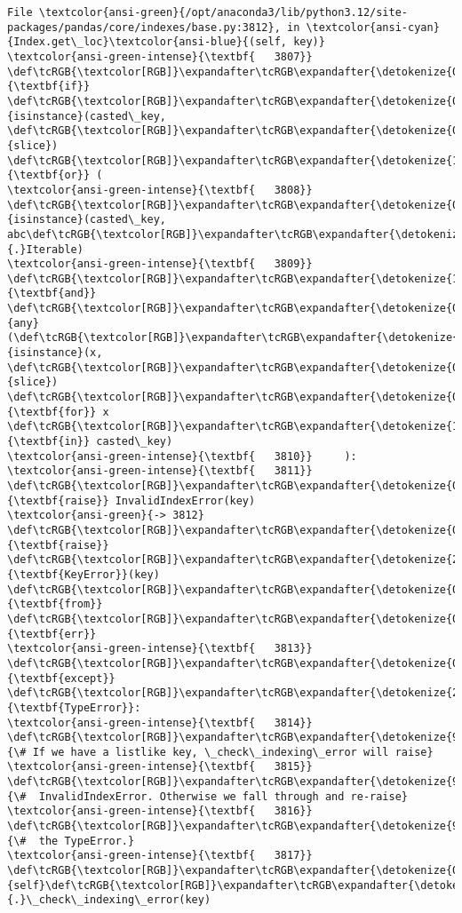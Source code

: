 \documentclass[11pt]{article}
\begin{document}
\begin{Verbatim}[commandchars=\\\{\}, frame=single, framerule=2mm, rulecolor=\color{outerrorbackground}]
File \textcolor{ansi-green}{/opt/anaconda3/lib/python3.12/site-packages/pandas/core/indexes/base.py:3812}, in \textcolor{ansi-cyan}{Index.get\_loc}\textcolor{ansi-blue}{(self, key)}
\textcolor{ansi-green-intense}{\textbf{   3807}}     \def\tcRGB{\textcolor[RGB]}\expandafter\tcRGB\expandafter{\detokenize{0,135,0}}{\textbf{if}} \def\tcRGB{\textcolor[RGB]}\expandafter\tcRGB\expandafter{\detokenize{0,135,0}}{isinstance}(casted\_key, \def\tcRGB{\textcolor[RGB]}\expandafter\tcRGB\expandafter{\detokenize{0,135,0}}{slice}) \def\tcRGB{\textcolor[RGB]}\expandafter\tcRGB\expandafter{\detokenize{175,0,255}}{\textbf{or}} (
\textcolor{ansi-green-intense}{\textbf{   3808}}         \def\tcRGB{\textcolor[RGB]}\expandafter\tcRGB\expandafter{\detokenize{0,135,0}}{isinstance}(casted\_key, abc\def\tcRGB{\textcolor[RGB]}\expandafter\tcRGB\expandafter{\detokenize{98,98,98}}{.}Iterable)
\textcolor{ansi-green-intense}{\textbf{   3809}}         \def\tcRGB{\textcolor[RGB]}\expandafter\tcRGB\expandafter{\detokenize{175,0,255}}{\textbf{and}} \def\tcRGB{\textcolor[RGB]}\expandafter\tcRGB\expandafter{\detokenize{0,135,0}}{any}(\def\tcRGB{\textcolor[RGB]}\expandafter\tcRGB\expandafter{\detokenize{0,135,0}}{isinstance}(x, \def\tcRGB{\textcolor[RGB]}\expandafter\tcRGB\expandafter{\detokenize{0,135,0}}{slice}) \def\tcRGB{\textcolor[RGB]}\expandafter\tcRGB\expandafter{\detokenize{0,135,0}}{\textbf{for}} x \def\tcRGB{\textcolor[RGB]}\expandafter\tcRGB\expandafter{\detokenize{175,0,255}}{\textbf{in}} casted\_key)
\textcolor{ansi-green-intense}{\textbf{   3810}}     ):
\textcolor{ansi-green-intense}{\textbf{   3811}}         \def\tcRGB{\textcolor[RGB]}\expandafter\tcRGB\expandafter{\detokenize{0,135,0}}{\textbf{raise}} InvalidIndexError(key)
\textcolor{ansi-green}{-> 3812}     \def\tcRGB{\textcolor[RGB]}\expandafter\tcRGB\expandafter{\detokenize{0,135,0}}{\textbf{raise}} \def\tcRGB{\textcolor[RGB]}\expandafter\tcRGB\expandafter{\detokenize{215,95,95}}{\textbf{KeyError}}(key) \def\tcRGB{\textcolor[RGB]}\expandafter\tcRGB\expandafter{\detokenize{0,135,0}}{\textbf{from}} \def\tcRGB{\textcolor[RGB]}\expandafter\tcRGB\expandafter{\detokenize{0,0,255}}{\textbf{err}}
\textcolor{ansi-green-intense}{\textbf{   3813}} \def\tcRGB{\textcolor[RGB]}\expandafter\tcRGB\expandafter{\detokenize{0,135,0}}{\textbf{except}} \def\tcRGB{\textcolor[RGB]}\expandafter\tcRGB\expandafter{\detokenize{215,95,95}}{\textbf{TypeError}}:
\textcolor{ansi-green-intense}{\textbf{   3814}}     \def\tcRGB{\textcolor[RGB]}\expandafter\tcRGB\expandafter{\detokenize{95,135,135}}{\# If we have a listlike key, \_check\_indexing\_error will raise}
\textcolor{ansi-green-intense}{\textbf{   3815}}     \def\tcRGB{\textcolor[RGB]}\expandafter\tcRGB\expandafter{\detokenize{95,135,135}}{\#  InvalidIndexError. Otherwise we fall through and re-raise}
\textcolor{ansi-green-intense}{\textbf{   3816}}     \def\tcRGB{\textcolor[RGB]}\expandafter\tcRGB\expandafter{\detokenize{95,135,135}}{\#  the TypeError.}
\textcolor{ansi-green-intense}{\textbf{   3817}}     \def\tcRGB{\textcolor[RGB]}\expandafter\tcRGB\expandafter{\detokenize{0,135,0}}{self}\def\tcRGB{\textcolor[RGB]}\expandafter\tcRGB\expandafter{\detokenize{98,98,98}}{.}\_check\_indexing\_error(key)


\end{Verbatim}
\end{document}
